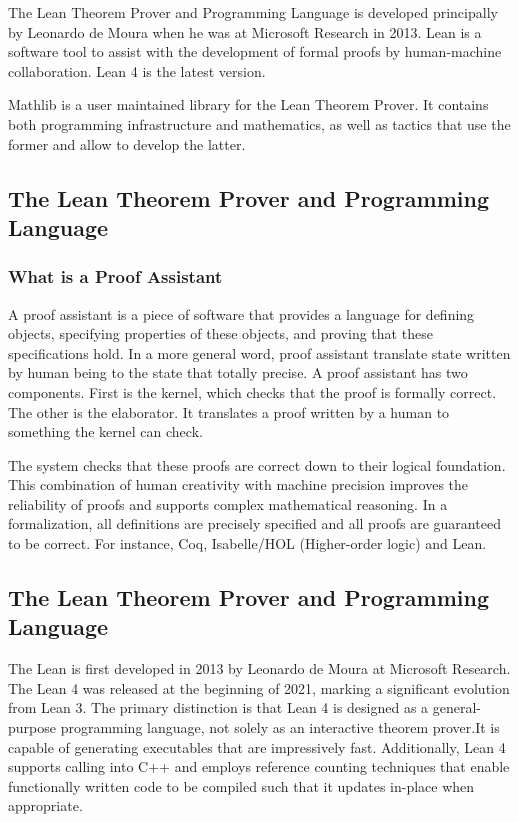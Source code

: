 The Lean Theorem Prover and Programming Language is developed principally by Leonardo de Moura when he was at Microsoft Research in 2013. Lean is a software tool to assist with the development of formal proofs by human-machine collaboration. Lean 4 is the latest version.

Mathlib is a user maintained library for the Lean Theorem Prover. It contains both programming infrastructure and mathematics, as well as tactics that use the former and allow to develop the latter.


\subsection{The Lean Theorem Prover and Programming Language}
\subsubsection{What is a Proof Assistant}
A proof assistant is a piece of software that provides a language for defining objects, specifying properties of these objects, and proving that these specifications hold. In a more general word, proof assistant translate state written by human being to the state that totally precise. A proof assistant has two components. First is the kernel, which checks that the proof is formally correct. The other is the elaborator. It translates a proof written by a human to something the kernel can check.

The system checks that these proofs are correct down to their logical foundation. This combination of human creativity with machine precision improves the reliability of proofs and supports complex mathematical reasoning. In a formalization, all definitions are precisely specified and all proofs are guaranteed to be correct. For instance, Coq, Isabelle/HOL (Higher-order logic) and Lean.
\subsection{The Lean Theorem Prover and Programming Language}
The Lean is first developed in 2013 by Leonardo de Moura at Microsoft Research. The Lean 4 was released at the beginning of 2021, marking a significant evolution from  Lean 3. The primary distinction is that Lean 4 is designed as a general-purpose programming language, not solely as an interactive theorem prover.It is capable of generating executables that are impressively fast. Additionally, Lean 4 supports calling into C++ and employs reference counting techniques that enable functionally written code to be compiled such that it updates in-place when appropriate.


